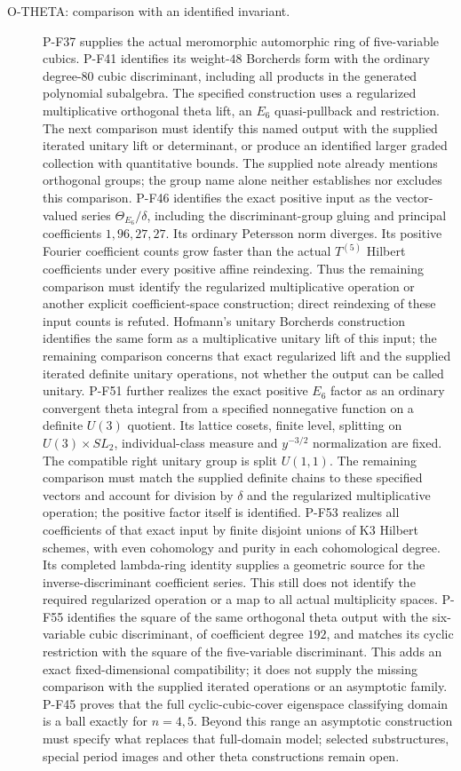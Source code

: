 \documentclass[11pt,a4paper]{article}
\begin{document}
\begin{description}
\item[O-THETA: comparison with an identified invariant.]
P-F37 supplies the actual meromorphic automorphic ring of
five-variable cubics. P-F41 identifies its weight-$48$
Borcherds form with the ordinary degree-$80$ cubic discriminant,
including all products in the generated polynomial subalgebra.
The specified construction uses a regularized multiplicative
orthogonal theta lift, an $E_6$ quasi-pullback and restriction.
The next comparison must identify this named output with the
supplied iterated unitary lift or determinant, or produce an
identified larger graded collection with quantitative bounds.
The supplied note already mentions orthogonal groups; the group
name alone neither establishes nor excludes this comparison.
P-F46 identifies the exact positive input as the vector-valued
series $\Theta_{E_6}/\delta$, including the discriminant-group
gluing and principal coefficients $1,96,27,27$. Its ordinary
Petersson norm diverges. Its positive Fourier coefficient counts
grow faster than the actual $T^{(5)}$ Hilbert coefficients under
every positive affine reindexing. Thus the remaining comparison
must identify the regularized multiplicative operation or another
explicit coefficient-space construction; direct reindexing of
these input counts is refuted. Hofmann's unitary Borcherds
construction identifies the same form as a multiplicative
unitary lift of this input; the remaining comparison concerns
that exact regularized lift and the supplied iterated definite
unitary operations, not whether the output can be called unitary.
P-F51 further realizes the exact positive $E_6$ factor as an
ordinary convergent theta integral from a specified nonnegative
function on a definite $U(3)$ quotient. Its lattice cosets,
finite level, splitting on $U(3)\times SL_2$, individual-class
measure and $y^{-3/2}$ normalization are fixed. The compatible
right unitary group is split $U(1,1)$. The remaining comparison
must match the supplied definite chains to these specified
vectors and account for division by $\delta$ and the regularized
multiplicative operation; the positive factor itself is identified.
P-F53 realizes all coefficients of that exact input by finite
disjoint unions of K3 Hilbert schemes, with even cohomology
and purity in each cohomological degree. Its completed
lambda-ring identity supplies a geometric source for the
inverse-discriminant coefficient series. This still does not
identify the required regularized operation or a map to all
actual multiplicity spaces.
P-F55 identifies the square of the same orthogonal theta output
with the six-variable cubic discriminant, of coefficient degree
$192$, and matches its cyclic restriction with the square of
the five-variable discriminant. This adds an exact fixed-dimensional
compatibility; it does not supply the missing comparison with
the supplied iterated operations or an asymptotic family.
P-F45 proves that the full cyclic-cubic-cover eigenspace
classifying domain is a ball exactly for $n=4,5$. Beyond
this range an asymptotic construction must specify what
replaces that full-domain model; selected substructures,
special period images and other theta constructions remain open.


\end{description}
\end{document}
